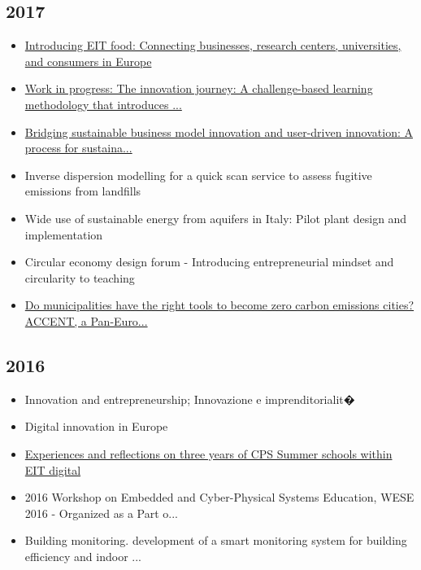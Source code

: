 \subsection*{2017}
\begin{itemize}[leftmargin=*, itemsep=0em, label=\textbullet]
\small
\item \href{https://doi.org/10.1094/CFW-60-6-0290}{Introducing EIT food: Connecting businesses, research centers, universities, and consumers in Europe}
\item \href{https://doi.org/10.1109/EDUCON.2017.7942821}{Work in progress: The innovation journey: A challenge-based learning methodology that introduces ...}
\item \href{https://doi.org/10.1016/j.jclepro.2017.01.081}{Bridging sustainable business model innovation and user-driven innovation: A process for sustaina...}
\item Inverse dispersion modelling for a quick scan service to assess fugitive emissions from landfills
\item Wide use of sustainable energy from aquifers in Italy: Pilot plant design and implementation
\item Circular economy design forum - Introducing entrepreneurial mindset and circularity to teaching
\item \href{https://doi.org/10.1007/978-3-319-54984-2_9}{Do municipalities have the right tools to become zero carbon emissions cities? ACCENT, a Pan-Euro...}
\end{itemize}

\subsection*{2016}
\begin{itemize}[leftmargin=*, itemsep=0em, label=\textbullet]
\small
\item Innovation and entrepreneurship; Innovazione e imprenditorialit�
\item Digital innovation in Europe
\item \href{https://doi.org/10.1145/3005329.3005336}{Experiences and reflections on three years of CPS Summer schools within EIT digital}
\item 2016 Workshop on Embedded and Cyber-Physical Systems Education, WESE 2016 - Organized as a Part o...
\item Building monitoring. development of a smart monitoring system for building efficiency and indoor ...
\end{itemize}

